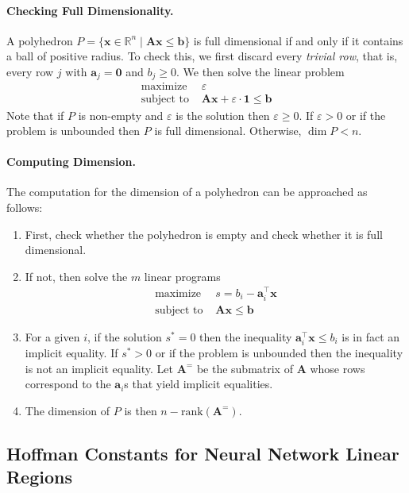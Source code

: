 \documentclass[10pt]{article}
\theoremstyle{definition}
\theoremstyle{remark}
\newcommand{\RR}{{\mathbb{R}}}
\renewcommand{\vec}[1]{\mathbf{#1}}
\def\va{{\vec{a}}}
\def\vb{{\vec{b}}}
\def\vx{{\vec{x}}}
\def\mA{{\bm{A}}}
\begin{document}
\paragraph{Checking Full Dimensionality.} A polyhedron $P = \{ \vx \in \RR^n \mid \mA \vx \le \vb \}$ is full dimensional if and only if it contains a ball of positive radius. 
To check this, we first discard every \emph{trivial row}, that is, every row $j$ with $\va_j = \mathbf 0 $ and $b_j \ge 0$. We then solve the linear problem
\begin{align*}
    \text{maximize } & \varepsilon \\
    \text{subject to } & \mA \vx + \varepsilon \cdot \mathbf{1} \le \vb
\end{align*}
Note that if $P$ is non-empty and $\varepsilon$ is the solution then $\varepsilon \ge 0$.
If $\varepsilon > 0$ or if the problem is unbounded then $P$ is full dimensional. Otherwise, $\dim P < n$.

\paragraph{Computing Dimension.} The computation for the dimension of a polyhedron can be approached as follows: 
\begin{enumerate}
    \item First, check whether the polyhedron is empty and check whether it is full dimensional.
    \item If not, then solve the $m$ linear programs
    \begin{align*}
    \text{maximize } & s = b_i - \va_i^{\top} \vx  \\
    \text{subject to } & \mA \vx \le \vb
    \end{align*}
    \item For a given $i$, if the solution $s^* = 0$ then the inequality $\va_i^{\top} \vx \le b_i$ is in fact an implicit equality. If $s^* > 0$ or if the problem is unbounded then the inequality is not an implicit equality. Let $\mA^=$ be the submatrix of $\mA$ whose rows correspond to the $\va_i$s that yield implicit equalities.
    \item The dimension of $P$ is then $n - \mathrm{rank}\left(\mA^=\right)$.
\end{enumerate}


\subsection{Hoffman Constants for Neural Network Linear Regions}
\end{document}
